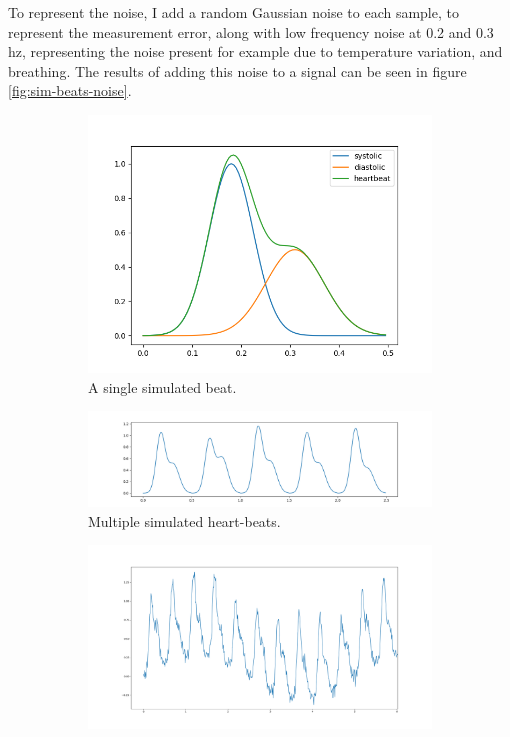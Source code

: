 \documentclass[12pt,a4paper,twoside,openany]{report}
\begin{document}
To represent the noise, I add a random Gaussian noise to each sample, to
represent the measurement error, along with low frequency noise at 0.2 and 0.3
hz, representing the noise present for example due to temperature variation,
and breathing.  
The results of adding this noise to a signal can be seen in figure
\ref{fig:sim-beats-noise}.

\begin{figure}[H]
	\centering
	\begin{subfigure}[b]{0.4\textwidth}
		\centerline{\includegraphics[width=\textwidth]{figs/sim-beat.png}}
		\caption{A single simulated beat.}
		\label{fig:sim-beat}
	\end{subfigure}
	\hfill
	\begin{subfigure}[b]{0.5\textwidth}
		\centerline{\includegraphics[width=\textwidth]{figs/sim-beats.png}}
		\caption{Multiple simulated heart-beats.}
		\label{fig:sim-beats}
	\end{subfigure}
	\hfill
	\begin{subfigure}[b]{0.6\textwidth}
		\centerline{\includegraphics[width=\textwidth]{figs/sim-beats-with-noise.png}}

\end{subfigure}
\end{figure}
\end{document}
